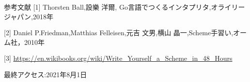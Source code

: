 \documentclass[uplatex,dvipdfmx,ja=standard]{beamer}
\begin{document}
\begin{frame}{参考文献}
    [1] Thorsten Ball,設樂 洋爾, Go言語でつくるインタプリタ,オライリージャパン,2018年

    [2] Daniel P.Friedman,Matthias Felleisen,元吉 文男,横山 晶一,Scheme手習い,オーム社，2010年
    
    [3] \url{https://en.wikibooks.org/wiki/Write_Yourself_a_Scheme_in_48_Hours}

    最終アクセス:2021年8月1日
\end{frame}

%
\end{document}
